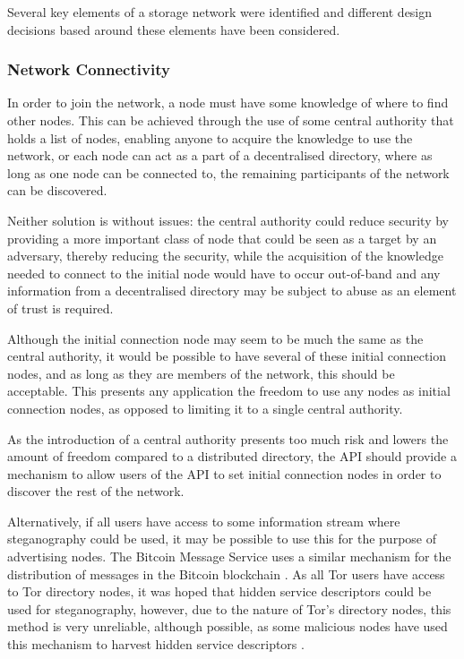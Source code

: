 Several key elements of a storage network were identified and different design decisions based around these elements have been considered. 
		
		\subsubsection{Network Connectivity}
			In order to join the network, a node must have some knowledge of where to find other nodes. This can be achieved through the use of some central authority that holds a list of nodes, enabling anyone to acquire the knowledge to use the network, or each node can act as a part of a decentralised directory, where as long as one node can be connected to, the remaining participants of the network can be discovered.
			
			Neither solution is without issues: the central authority could reduce security by providing a more important class of node that could be seen as a target by an adversary, thereby reducing the security, while the acquisition of the knowledge needed to connect to the initial node would have to occur out-of-band and any information from a decentralised directory may be subject to abuse as an element of trust is required.
			
			Although the initial connection node may seem to be much the same as the central authority, it would be possible to have several of these initial connection nodes, and as long as they are members of the network, this should be acceptable. This presents any application the freedom to use any nodes as initial connection nodes, as opposed to limiting it to a single central authority.
			
			As the introduction of a central authority presents too much risk and lowers the amount of freedom compared to a distributed directory, the API should provide a mechanism to allow users of the API to set initial connection nodes in order to discover the rest of the network.
			
			Alternatively, if all users have access to some information stream where steganography could be used, it may be possible to use this for the purpose of advertising nodes. The Bitcoin Message Service uses a similar mechanism for the distribution of messages in the Bitcoin blockchain \cite{btcmsg}. As all Tor users have access to Tor directory nodes, it was hoped that hidden service descriptors could be used for steganography, however, due to the nature of Tor's directory nodes, this method is very unreliable, although possible, as some malicious nodes have used this mechanism to harvest hidden service descriptors \cite{crawl}.
			
